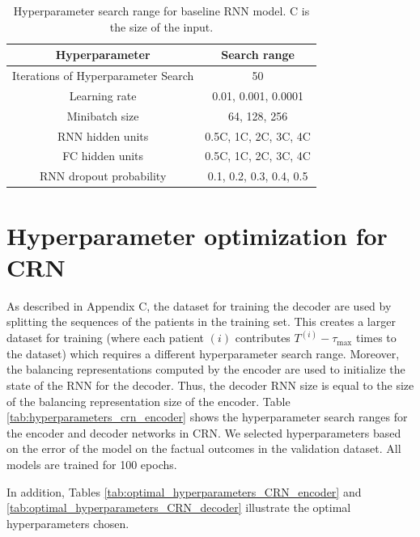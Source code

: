 \documentclass{article} %
\begin{document}
	\begin{table}[ht]
		\caption{Hyperparameter search range for baseline RNN model. C is the size of the input.}
		\label{tab:hyperparameters_baseline_rnn}
		\vskip 0.15in
		\begin{center}
			\begin{small}
				\begin{tabular}{cc}
					\toprule
					Hyperparameter & Search range \\
					\hline
					\hline
					Iterations of Hyperparameter Search & 50 \\
					Learning rate &    0.01, 0.001, 0.0001  \\
					Minibatch size &  64, 128, 256  \\
					RNN hidden units &  0.5C, 1C, 2C, 3C, 4C   \\
					FC hidden units & 0.5C, 1C, 2C, 3C, 4C \\
					RNN dropout probability &  0.1, 0.2, 0.3, 0.4, 0.5 \\
					\bottomrule
				\end{tabular}
			\end{small}
		\end{center}
		\vskip -0.1in
	\end{table}
	
	\newpage
	\section{Hyperparameter optimization for CRN} \label{apx:hyperparameter_optimization}
	
	As described in Appendix C, the dataset for training the decoder are used by splitting the sequences of the patients in the training set. This creates a larger dataset for training (where each patient $(i)$ contributes $T^{(i)} - \tau_{\max}$ times to the dataset) which requires a different hyperparameter search range. Moreover, the balancing representations computed by the encoder are used to initialize the state of the RNN for the decoder. Thus, the decoder RNN size is equal to the size of the balancing representation size of the encoder. Table \ref{tab:hyperparameters_crn_encoder} shows the hyperparameter search ranges for the encoder and decoder networks in CRN. We selected hyperparameters based on the error of the model on the factual outcomes in the validation dataset. All models are trained for 100 epochs. 
	
	
	In addition, Tables \ref{tab:optimal_hyperparameters_CRN_encoder} and \ref{tab:optimal_hyperparameters_CRN_decoder} illustrate the optimal hyperparameters chosen. 
	
\end{document}
